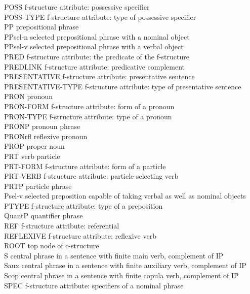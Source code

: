 \documentclass[output=paper]{langsci/langscibook}
\begin{document}
\begin{tabbing}
POSS \> f-structure attribute: possessive specifier\\
POSS-TYPE \> f-structure attribute: type of possessive specifier\\
PP \> prepositional phrase\\
PPsel-n \> selected prepositional phrase with a nominal object\\
PPsel-v \> selected prepositional phrase with a verbal object\\
PRED \> f-structure attribute: the predicate of the f-structure\\
PREDLINK \> f-structure attribute: predicative complement\\
PRESENTATIVE \> f-structure attribute: presentative sentence\\
PRESENTATIVE-TYPE \> f-structure attribute: type of presentative sentence\\
PRON \> pronoun\\
PRON-FORM \> f-structure attribute: form of a pronoun\\
PRON-TYPE \> f-structure attribute: type of a pronoun\\
PRONP \> pronoun phrase\\
PRONrfl \> reflexive pronoun\\
PROP \> proper noun\\
PRT \> verb particle\\
PRT-FORM \> f-structure attribute: form of a particle\\
PRT-VERB \> f-structure attribute: particle-selecting verb\\
PRTP \> particle phrase\\
Psel-v \> selected preposition capable of taking verbal as well as nominal objects\\
PTYPE \> f-structure attribute: type of a preposition\\
QuantP \> quantifier phrase\\
REF \> f-structure attribute: referential\\
REFLEXIVE \> f-structure attribute: reflexive verb\\
ROOT \> top node of c-structure\\
S \> central phrase in a sentence with finite main verb, complement of IP\\
Saux \> central phrase in a sentence with finite auxiliary verb, complement of IP\\
Scop \> central phrase in a sentence with finite copula verb, complement of IP\\
SPEC \> f-structure attribute: specifiers of a nominal phrase\\

\end{tabbing}
\end{document}
